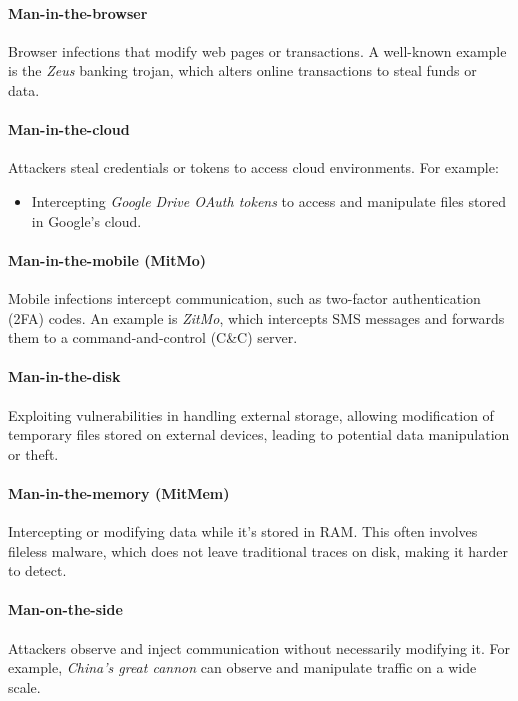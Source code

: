 \paragraph{Man-in-the-browser}
Browser infections that modify web pages or transactions. A well-known
example is the \textit{Zeus} banking trojan, which alters online
transactions to steal funds or data.

\paragraph{Man-in-the-cloud}
Attackers steal credentials or tokens to access cloud environments.
For example:
\begin{itemize}
    \item Intercepting \textit{Google Drive OAuth tokens} to access
      and manipulate files stored in Google’s cloud.
\end{itemize}

\paragraph{Man-in-the-mobile (MitMo)}
Mobile infections intercept communication, such as two-factor
authentication (2FA) codes. An example is \textit{ZitMo}, which
intercepts SMS messages and forwards them to a command-and-control
(C\&C) server.

\paragraph{Man-in-the-disk}
Exploiting vulnerabilities in handling external storage, allowing
modification of temporary files stored on external devices, leading to
potential data manipulation or theft.

\paragraph{Man-in-the-memory (MitMem)}
Intercepting or modifying data while it's stored in RAM. This often
involves fileless malware, which does not leave traditional traces on
disk, making it harder to detect.

\paragraph{Man-on-the-side}
Attackers observe and inject communication without necessarily
modifying it. For example, \textit{China's great cannon} can observe
and manipulate traffic on a wide scale.

